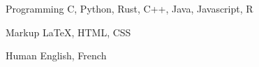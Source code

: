 

\begin{cvskills}

  \cvskill
    {\hspace{4em}Programming} %
    {C, Python, Rust, C++, Java, Javascript, R} %

  \cvskill
    {Markup} %
    {\LaTeX, HTML, CSS} %

  \cvskill
    {Human} %
    {English, French} %

\end{cvskills}
